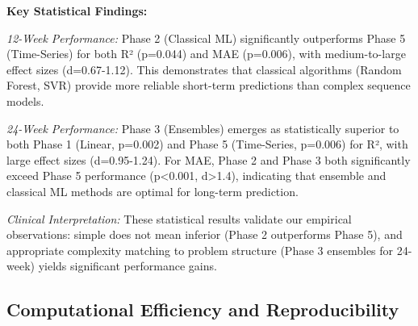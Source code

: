 \documentclass[conference]{IEEEtran}
\begin{document}
\begin{table}[h]
\centering
\caption{Statistical Significance of Pairwise Phase Comparisons. Mann-Whitney U test results for R² performance differences. Significance levels: ***p<0.001, **p<0.01, *p<0.05, ns=not significant. Cohen's d quantifies effect size (small: 0.2-0.5, medium: 0.5-0.8, large: >0.8).}
\label{tab:phase_stats}
\end{table}

\textbf{Key Statistical Findings:}

\textit{12-Week Performance:} Phase 2 (Classical ML) significantly outperforms Phase 5 (Time-Series) for both R² (p=0.044) and MAE (p=0.006), with medium-to-large effect sizes (d=0.67-1.12). This demonstrates that classical algorithms (Random Forest, SVR) provide more reliable short-term predictions than complex sequence models.

\textit{24-Week Performance:} Phase 3 (Ensembles) emerges as statistically superior to both Phase 1 (Linear, p=0.002) and Phase 5 (Time-Series, p=0.006) for R², with large effect sizes (d=0.95-1.24). For MAE, Phase 2 and Phase 3 both significantly exceed Phase 5 performance (p<0.001, d>1.4), indicating that ensemble and classical ML methods are optimal for long-term prediction.

\textit{Clinical Interpretation:} These statistical results validate our empirical observations: simple does not mean inferior (Phase 2 outperforms Phase 5), and appropriate complexity matching to problem structure (Phase 3 ensembles for 24-week) yields significant performance gains.

\subsection{Computational Efficiency and Reproducibility}
\end{document}
